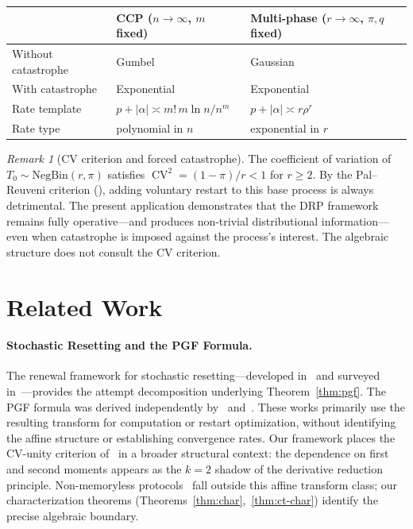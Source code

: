 \documentclass[11pt]{article}
\theoremstyle{plain}
\theoremstyle{definition}
\theoremstyle{remark}
\newtheorem{remark}[theorem]{Remark}
\DeclareMathOperator{\CV}{CV}
\begin{document}
\begin{center}
\small
\renewcommand{\arraystretch}{1.2}
\begin{tabular}{lll}
\toprule
& \textbf{CCP ($n \to \infty$, $m$ fixed)} & \textbf{Multi-phase ($r \to \infty$, $\pi, q$ fixed)} \\
\midrule
Without catastrophe & Gumbel & Gaussian \\
With catastrophe & Exponential & Exponential \\
Rate template & $p + |\alpha| \asymp m!\,m\ln n/n^m$ & $p + |\alpha| \asymp r\rho^r$ \\
Rate type & polynomial in $n$ & exponential in $r$ \\
\bottomrule
\end{tabular}
\end{center}

\begin{remark}[CV criterion and forced catastrophe]\label{rem:cv}
The coefficient of variation of $T_0 \sim \mathrm{NegBin}(r, \pi)$ satisfies $\CV^2 = (1-\pi)/r < 1$ for $r \geq 2$.  By the Pal--Reuveni criterion (\cite{Reuveni16}), adding voluntary restart to this base process is always detrimental.  The present application demonstrates that the DRP framework remains fully operative---and produces non-trivial distributional information---even when catastrophe is imposed against the process's interest.  The algebraic structure does not consult the CV criterion.
\end{remark}



\section{Related Work}\label{sec:related}

\paragraph{Stochastic Resetting and the PGF Formula.}
The renewal framework for stochastic resetting---developed in~\cite{EM11, Reuveni16, PalReuveni17, CS18} and surveyed in~\cite{EMS20}---provides the attempt decomposition underlying Theorem~\ref{thm:pgf}.  The PGF formula was derived independently by~\cite{FP21} and~\cite{BP21}.  These works primarily use the resulting transform for computation or restart optimization, without identifying the affine structure or establishing convergence rates. Our framework places the CV-unity criterion of~\cite{Reuveni16}
in a broader structural context: the dependence on first and second moments appears as the $k=2$ shadow of the derivative reduction principle. %
Non-memoryless protocols~\cite{EuleMetzger16, CY22, KBHR25} fall outside this affine transform class; our characterization theorems (Theorems~\ref{thm:char},~\ref{thm:ct-char}) identify the precise algebraic boundary.
\end{document}
